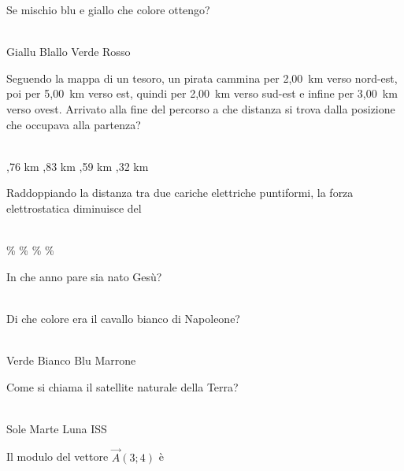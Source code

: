 \documentclass[a4paper,11pt]{exam}
\begin{document}
\begin{questions}

    
\question Se mischio blu e giallo che colore ottengo?\\\
\begin{oneparchoices}
  \choice Giallu
  \choice Blallo
  \choice Verde
  \choice Rosso
\end{oneparchoices}

    
\question Seguendo la mappa di un tesoro, un pirata cammina per 2,00~km verso nord-est, poi per 5,00~km verso est, quindi per 2,00~km verso sud-est e infine per 3,00~km verso ovest. Arrivato alla fine del percorso a che distanza si trova dalla posizione che occupava alla partenza?\\\
\begin{oneparchoices}
  ,76 km
  \choice 4,83 km
  \choice 4,59 km
  ,32 km
\end{oneparchoices}

    
\question Raddoppiando la distanza tra due cariche elettriche puntiformi, la forza elettrostatica diminuisce del\\\
\begin{oneparchoices}
  \choice 75\%
  \choice 25\%
  \%
  \%
\end{oneparchoices}

    
\question In che anno pare sia nato Gesù?\\\
\begin{oneparchoices}
  \choice 20
  \choice 2019
  \choice -80
\end{oneparchoices}

    
\question Di che colore era il cavallo bianco di Napoleone?\\\
\begin{oneparchoices}
  \choice Verde
  \choice Bianco
  \choice Blu 
  \choice Marrone
\end{oneparchoices}

    
\question Come si chiama il satellite naturale della Terra?\\\
\begin{oneparchoices}
  \choice Sole
  \choice Marte
  \choice Luna
  \choice ISS
\end{oneparchoices}

    
\question Il modulo del vettore $\vec{A}(3;4)$ è\\\
\begin{oneparchoices}
  \choice 8
  \choice 25
  \choice 12
\end{oneparchoices}


\end{questions}
\end{document}

